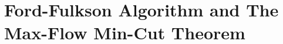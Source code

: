 \setcounter{definition}{0} \setcounter{property}{0} \setcounter{claim}{0} \setcounter{fact}{0} \setcounter{corollary}{0} \setcounter{figure}{0}
\section{Ford-Fulkson Algorithm and The Max-Flow Min-Cut Theorem}



